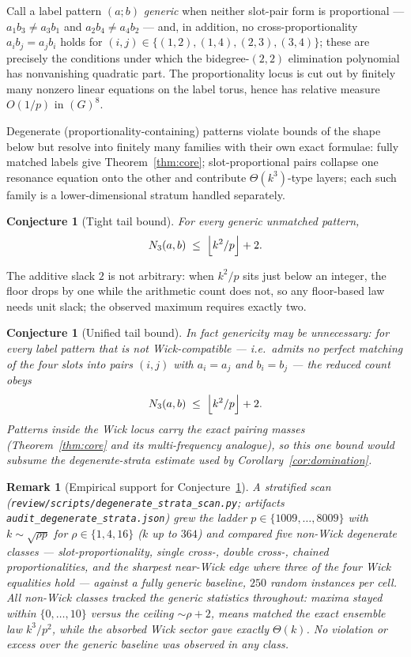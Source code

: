 \documentclass[11pt]{article}
\newtheorem{remark}[theorem]{Remark}
\newtheorem{conjecture}[theorem]{Conjecture}
\begin{document}
Call a label pattern $(a;b)$ \emph{generic} when neither slot-pair form
is proportional --- $a_1b_3\ne a_3b_1$ and $a_2b_4\ne a_4b_2$ --- and,
in addition, no cross-proportionality $a_ib_j=a_jb_i$ holds for
$(i,j)\in\{(1,2),(1,4),(2,3),(3,4)\}$; these are precisely the
conditions under which the bidegree-$(2,2)$ elimination polynomial has
nonvanishing quadratic part. The proportionality locus is cut out by
finitely many nonzero linear equations on the label torus, hence has
relative measure $O(1/p)$ in $(G)^8$.

Degenerate (proportionality-containing) patterns violate bounds of
the shape below but resolve into finitely many families with their own
exact formulae: fully matched labels give Theorem~\ref{thm:core};
slot-proportional pairs collapse one resonance equation onto the other
and contribute $\Theta(k^{3})$-type layers; each such family is a
lower-dimensional stratum handled separately.

\begin{conjecture}[Tight tail bound]\label{conj:tight}
For every generic unmatched pattern,
\[
N_3(a,b)\;\le\;\Bigl\lfloor k^{2}/p\Bigr\rfloor+2 .
\]
\end{conjecture}

The additive slack $2$ is not arbitrary: when $k^2/p$ sits just below
an integer, the floor drops by one while the arithmetic count does
not, so any floor-based law needs unit slack; the observed maximum
requires exactly two.

\begin{conjecture}[Unified tail bound]\label{conj:unified}
In fact genericity may be unnecessary: for \emph{every} label pattern
that is not Wick-compatible --- i.e.\ admits no perfect matching of
the four slots into pairs $(i,j)$ with $a_i=a_j$ and $b_i=b_j$ ---
the reduced count obeys
\[
N_3(a,b)\;\le\;\Bigl\lfloor k^{2}/p\Bigr\rfloor+2 .
\]
Patterns inside the Wick locus carry the exact pairing masses
(Theorem~\ref{thm:core} and its multi-frequency analogue), so this
one bound would subsume the degenerate-strata estimate used by
Corollary~\ref{cor:domination}.
\end{conjecture}

\begin{remark}[Empirical support for Conjecture~\ref{conj:unified}]
A stratified scan (\texttt{review/scripts/degenerate\_strata\_scan.py};
artifacts \texttt{audit\_degenerate\_strata.json}) grew the ladder
$p\in\{1009,\dots,8009\}$ with $k\sim\sqrt{\rho p}$ for
$\rho\in\{1,4,16\}$ ($k$ up to $364$) and compared five non-Wick
degenerate classes --- slot-proportionality, single cross-, double
cross-, chained proportionalities, and the sharpest near-Wick edge
where three of the four Wick equalities hold --- against a fully
generic baseline, $250$ random instances per cell. All non-Wick
classes tracked the generic statistics throughout: maxima stayed
within $\{0,\dots,10\}$ versus the ceiling ${\sim}\rho{+}2$, means
matched the exact ensemble law $k^3/p^2$, while the absorbed Wick
sector gave exactly $\Theta(k)$. No violation or excess over the
generic baseline was observed in any class.
\end{remark}
\end{document}
